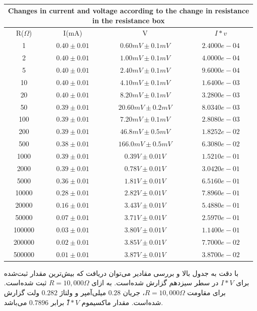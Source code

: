 \documentclass{article}
\begin{document}
\begin{latin}
\begin{center}
\begin{table}[h!]
\begin{tabular}{|c|c|c|c|}
\hline
\multicolumn{4}{|c|}{Changes in current and voltage according to the change in resistance in the resistance box} \\
\hline
R($\Omega$) & I(mA) & V & $I*v$\\
\hline
1&$0.40\pm0.01$ &$0.60mV\pm0.1mV$& $2.4000e-04$ \\ 
\hline
2&$0.40\pm0.01$ &$1.00mV\pm0.1mV$& $ 4.0000e-04$ \\
\hline
5&$0.40\pm0.01$ &$2.40mV\pm0.1mV$& $9.6000e-04$ \\
\hline
10&$0.40\pm0.01$ &$4.10mV\pm0.1mV$& $1.6400e-03$ \\
\hline
20&$0.40\pm0.01$ &$8.20mV\pm0.1mV$& $3.2800e-03$ \\
\hline
50&$0.39\pm0.01$ &$20.60mV\pm0.2mV$& $8.0340e-03$ \\
\hline
100&$0.39\pm0.01$ &$7.20mV\pm0.1mV$& $2.8080e-03$ \\
\hline
200&$0.39\pm0.01$ &$46.8mV\pm0.5mV$& $1.8252e-02$ \\
\hline
500&$0.38\pm0.01$ &$166.0mV\pm0.5mV$& $6.3080e-02$ \\
\hline
1000&$0.39\pm0.01$ &$0.39V\pm0.01V$& $1.5210e-01$ \\
\hline
2000&$0.39\pm0.01$ &$0.78V\pm0.01V$& $3.0420e-01$ \\
\hline
5000&$0.36\pm0.01$ &$1.81V\pm0.01V$& $6.5160e-01$ \\
\hline
10000&$0.28\pm0.01$ &$2.82V\pm0.01V$& $7.8960e-01$ \\
\hline
20000&$0.16\pm0.01$ &$3.43V\pm0.01V$& $5.4880e-01$ \\
\hline
50000&$0.07\pm0.01$ &$3.71V\pm0.01V$& $2.5970e-01$ \\
\hline
100000&$0.03\pm0.01$ &$3.80V\pm0.01V$& $1.1400e-01$ \\
\hline
200000&$0.02\pm0.01$ &$3.85V\pm0.01V$& $7.7000e-02$ \\
\hline
500000&$0.01\pm0.01$ &$3.87V\pm0.01V$& $3.8700e-02$ \\
\hline
\end{tabular}
\caption{}
\end{table}
\end{center}
\end{latin}
با دقت به جدول بالا و بررسی مقادیر می‌توان دریافت که بیش‌ترین مقدار ثبت‌شده برای $I*V$ در سطر سیزدهم گزارش شده‌است. به ازای $R= 10,000 \Omega$ ثبت شده‌است. برای مقاومت $R= 10,000 \Omega$، جریان $0.28$ میلی‌آمپر و ولتاژ $0.282$ ولت گزارش شده‌است. مقدار ماکسیموم $ّI*V$ برابر $0.7896$ می‌باشد.\\
\end{document}
